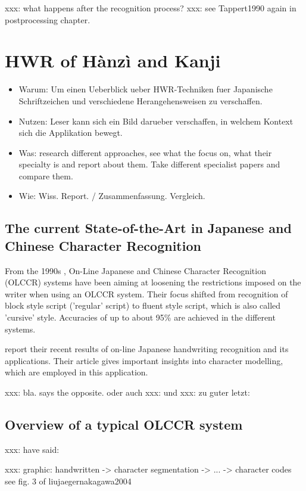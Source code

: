 xxx: what happens after the recognition process?
xxx: see Tappert1990 again in postprocessing chapter.

\section{HWR of Hànzì and Kanji}
\begin{itemize}
\item Warum: Um einen Ueberblick ueber HWR-Techniken fuer Japanische 
  Schriftzeichen und verschiedene Herangehensweisen zu verschaffen.
\item Nutzen: Leser kann sich ein Bild darueber verschaffen,
  in welchem Kontext sich die Applikation bewegt.
\item Was: research different approaches, see what the focus on, 
  what their specialty is and report about them. Take different specialist 
  papers and compare them.
\item Wie: Wiss. Report. / Zusammenfassung. Vergleich. 
\end{itemize}

\subsection{The current State-of-the-Art in Japanese and Chinese Character Recognition}
From the 1990s  , On-Line Japanese and Chinese Character Recognition 
(OLCCR) systems have been aiming at loosening the restrictions imposed on 
the writer when using an OLCCR system. Their focus shifted from recognition 
of block style script ('regular' script) to fluent style script, 
which is also called 'cursive' style. Accuracies of up to about 95\% are
achieved in the different systems.

\cite{Nakagawa2008} report their recent results of on-line Japanese 
handwriting recognition and its applications. Their article gives 
important insights into character modelling, which are employed in 
this application.

xxx: bla.  says the opposite. \cite{ChenLee1996} oder auch 
xxx: \cite{Nakagawa2008} und \cite{Nakai2003} 
xxx: zu guter letzt: \cite{Santosh2009}

\subsection{Overview of a typical OLCCR system}

xxx:  \cite{LiuJaegerNakagawa2004} have said: 

\cite{Keogh2001}
xxx:  graphic:
handwritten -> character segmentation -> ... -> character codes
see fig. 3 of liujaegernakagawa2004

